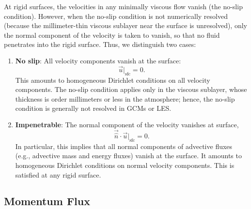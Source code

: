 \documentclass{report}
\begin{document}
At rigid surfaces, the velocities in any minimally viscous flow vanish (the no-slip condition). However, when the no-slip condition is not numerically resolved (because the millimeter-thin viscous sublayer near the surface is unresolved), only the normal component of the velocity is taken to vanish, so that no fluid penetrates into the rigid surface. Thus, we distinguish two cases:
\begin{enumerate}
    \item \textbf{No slip}: All velocity components vanish at the surface:
    \[
    \vec{u}\bigl|_\mathrm{sfc} =  0.
    \]
    This amounts to homogeneous Dirichlet conditions on all velocity components. The no-slip condition applies only in the viscous sublayer, whose thickness is order millimeters or less in the atmosphere; hence, the no-slip condition is generally not resolved in GCMs or LES. 
    \item \textbf{Impenetrable}: The normal component of the velocity vanishes at surface,
    \[
    \vec{\hat n} \cdot \vec{u}\bigl|_\mathrm{sfc}  = 0.
    \]
    In particular, this implies that all normal components of advective fluxes (e.g., advective mass and energy fluxes) vanish at the surface. It amounts to homogeneous Dirichlet conditions on normal velocity components. This is satisfied at any rigid surface.
    
\end{enumerate}

\subsection{Momentum Flux}
\end{document}
